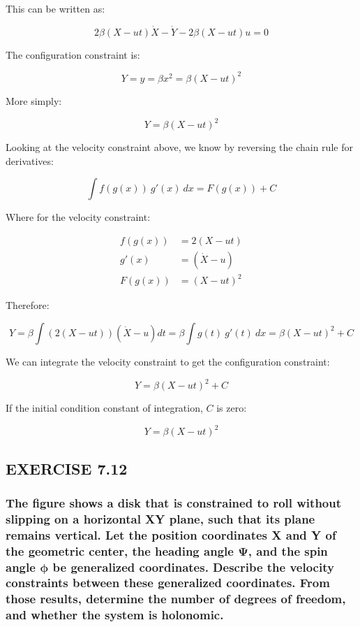 \documentclass[12pt, letterpaper]{../assignment}
\begin{document}
This can be written as:

\begin{answer}
$$  2 \beta \left( X - ut \right)\dot{X}- \dot{Y} - 2 \beta \left( X - ut \right)u = 0  $$
\end{answer}

The configuration constraint is:

$$ Y = y = \beta x^2 = \beta \left( X - ut \right)^2 $$

More simply:

\begin{answer}
$$ Y =  \beta \left( X - ut \right)^2 $$
\end{answer}

Looking at the velocity constraint above, we know by reversing the chain rule for derivatives:

$$ \int f(g(x))\ g'(x)\ dx = F(g(x)) + C $$

Where for the velocity constraint:

\begin{equation*}
    \begin{aligned}
        f(g(x)) &= 2 \left( X - ut \right)\\
        g'(x) &= \left( \dot{X} - u \right)\\
        F(g(x)) &= \left( X - ut \right)^2
    \end{aligned}
\end{equation*}

Therefore:

$$ Y = \beta \int \left(2 \left( X - ut \right)\right) \left( \dot{X} - u \right) dt = 
\beta \int g(t)\ g'(t)\ dx = \beta \left( X - ut \right)^2  + C $$

We can integrate the velocity constraint to get the configuration constraint:

$$ Y =  \beta \left( X - ut \right)^2 + C $$

If the initial condition constant of integration, $C$ is zero:

\begin{answer}
    $$ Y =  \beta \left( X - ut \right)^2 $$
\end{answer}


\subsection*{EXERCISE 7.12}
\subsubsection*{The figure shows a disk that is constrained to roll
without slipping on a horizontal XY plane,
such that its plane remains vertical.
Let the position coordinates X and Y of the geometric center,
the heading angle $\bm{\Psi}$,
and the spin angle $\bm{\phi}$ be generalized coordinates.
Describe the velocity constraints between these generalized coordinates.
From those results, determine the number of degrees of freedom,
and whether the system is holonomic.}
\end{document}
